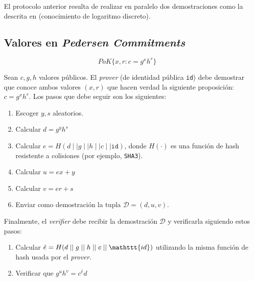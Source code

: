El protocolo anterior resulta de realizar en paralelo dos demostraciones como la descrita en \cite{schnorr1989efficient} (conocimiento de logaritmo discreto).

\subsection{Valores en \emph{Pedersen Commitments}}

$$PoK\{x, r : c = g^x h^r\}$$

Sean $c, g, h$ valores públicos. El \emph{prover} (de identidad pública 
\texttt{id}) debe demostrar que conoce ambos valores $(x,r)$ que hacen verdad 
la siguiente proposición: $c = g^x h^r$. Los pasos que debe seguir son los 
siguientes:
\begin{enumerate}
	\item Escoger $y, s$ aleatorios.
	\item Calcular $d = g^y h^s$
	\item Calcular $e = H(d \mid\mid g \mid\mid h \mid\mid c \mid\mid \mathtt{id})$, donde $H(\cdot)$ es una función de hash resistente a colisiones (por ejemplo, \texttt{SHA3}).
	\item Calcular $u = ex + y$
	\item Calcular $v = er + s$
	\item Enviar como demostración la tupla $\mathcal{D} = (d, u, v)$.
\end{enumerate}

Finalmente, el \emph{verifier} debe recibir la demostración $\mathcal{D}$ y 
verificarla siguiendo estos pasos:
\begin{enumerate}
	\item Calcular $\hat{e} = H(d \mid\mid g \mid\mid h \mid\mid c \mid\mid \mathttt{id})$ utilizando la misma función de hash usada por el \emph{prover}.
	\item Verificar que $g^u h^v = c^\hat{e} d$
\end{enumerate}
